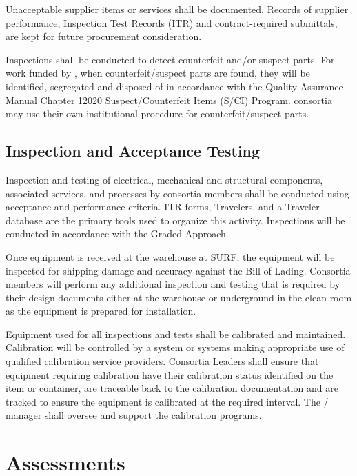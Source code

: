 Unacceptable supplier items or services shall be documented. Records
of supplier performance, Inspection Test Records (ITR) and
contract-required submittals, are kept for future procurement
consideration.

Inspections shall be conducted to detect counterfeit and/or suspect
parts. For work funded by , when counterfeit/suspect parts
are found, they will be identified, segregated and disposed of in
accordance with the \fnal Quality Assurance Manual Chapter 12020
Suspect/Counterfeit Items (S/CI) Program.  consortia may
use their own institutional procedure for counterfeit/suspect parts.

\subsection{Inspection and Acceptance Testing}

Inspection and testing of electrical, mechanical and structural
components, associated services, and processes by consortia members
shall be conducted using acceptance and performance criteria. ITR
forms, Travelers, and a Traveler database are the primary tools used
to organize this activity. Inspections will be conducted in accordance
with the Graded Approach.

Once equipment is received at the warehouse at SURF, the equipment will 
be inspected for shipping damage and accuracy against the Bill of Lading. 
Consortia members will perform any additional inspection and testing that 
is required by their design documents either at the warehouse or 
underground in the clean room as the equipment is prepared for 
installation.

Equipment used for all inspections and tests shall be calibrated and
maintained. Calibration will be controlled by a system or systems
making appropriate use of qualified calibration service
providers. Consortia Leaders shall ensure that equipment requiring
calibration have their calibration status identified on the item or
container, are traceable back to the calibration documentation and are
tracked to ensure the equipment is calibrated at the required
interval. The /  manager shall
oversee and support the  calibration programs.

\section{Assessments}

